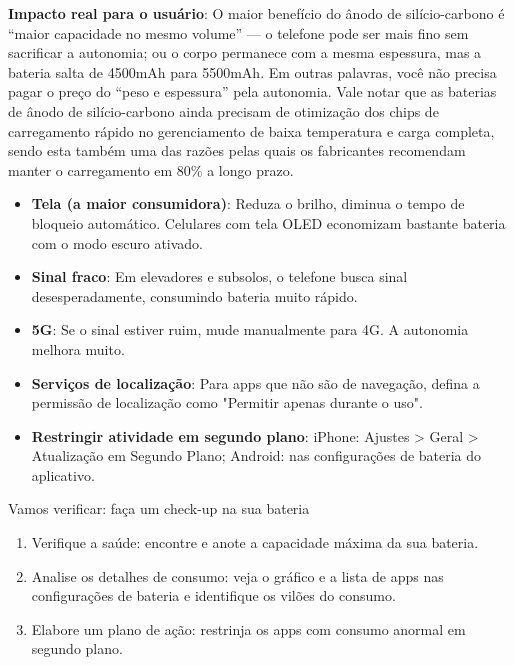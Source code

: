 \textbf{Impacto real para o usuário}: O maior benefício do ânodo de silício-carbono é “maior capacidade no mesmo volume” — o telefone pode ser mais fino sem sacrificar a autonomia; ou o corpo permanece com a mesma espessura, mas a bateria salta de 4500mAh para 5500mAh. Em outras palavras, você não precisa pagar o preço do “peso e espessura” pela autonomia. Vale notar que as baterias de ânodo de silício-carbono ainda precisam de otimização dos chips de carregamento rápido no gerenciamento de baixa temperatura e carga completa, sendo esta também uma das razões pelas quais os fabricantes recomendam manter o carregamento em 80\% a longo prazo.


\begin{itemize}
  \item \textbf{Tela (a maior consumidora)}: Reduza o brilho, diminua o tempo de bloqueio automático. Celulares com tela OLED economizam bastante bateria com o modo escuro ativado.
  \item \textbf{Sinal fraco}: Em elevadores e subsolos, o telefone busca sinal desesperadamente, consumindo bateria muito rápido.
  \item \textbf{5G}: Se o sinal estiver ruim, mude manualmente para 4G. A autonomia melhora muito.
  \item \textbf{Serviços de localização}: Para apps que não são de navegação, defina a permissão de localização como "Permitir apenas durante o uso".
  \item \textbf{Restringir atividade em segundo plano}: iPhone: Ajustes > Geral > Atualização em Segundo Plano; Android: nas configurações de bateria do aplicativo.
\end{itemize}

\begin{tcbpractice}{Vamos verificar: faça um check-up na sua bateria}
\begin{enumerate}
  \item Verifique a saúde: encontre e anote a capacidade máxima da sua bateria.
  \item Analise os detalhes de consumo: veja o gráfico e a lista de apps nas configurações de bateria e identifique os vilões do consumo.
  \item Elabore um plano de ação: restrinja os apps com consumo anormal em segundo plano.
\end{enumerate}

\end{tcbpractice}
